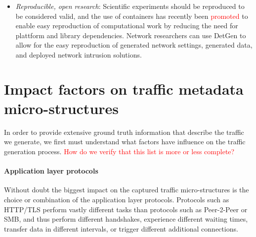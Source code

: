 \documentclass{article}
\begin{document}
\begin{itemize}
\item \textit{Reproducible, open research}: Scientific experiments should be reproduced to be considered valid, and the use of containers has recently been \textcolor{red}{promoted} to enable easy reproduction of computational work by reducing the need for plattform and library dependencies. Network researchers can use DetGen to allow for the easy reproduction of generated network settings, generated data, and deployed network intrusion solutions. 

\end{itemize}



\section{Impact factors on traffic metadata micro-structures}\label{Sec:Impactfactors}

In order to provide extensive ground truth information that describe the traffic we generate, we first must understand what factors have influence on the traffic generation process. \textcolor{red}{How do we verify that this list is more or less complete?}

\paragraph{Application layer protocols} 
Without doubt the biggest impact on the captured traffic micro-structures is the choice or combination of the application layer protocols. Protocols such as HTTP/TLS perform vastly different tasks than protocols such as Peer-2-Peer or SMB, and thus perform different handshakes, experience different waiting times, transfer data in different intervals, or trigger different additional connections. 
 
\end{document}
